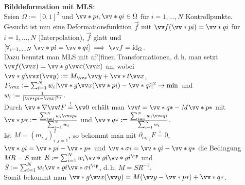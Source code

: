\linie

\textbf{Bilddeformation mit MLS}:\\
Seien $\Omega := [0, 1]^2$ und $\vecs{p}{i}, \vecs{q}{i} \in \Omega$
für $i = 1, \dotsc, N$ Kontrollpunkte.\\
Gesucht ist nun eine Deformationsfunktion $\vec{f}$ mit
$\vec{f}(\vecs{p}{i}) = \vecs{q}{i}$ für $i = 1, \dotsc, N$ (Interpolation),
$\vec{f}$ glatt und
$[\forall_{i=1,\dotsc,N}\; \vecs{p}{i} = \vecs{q}{i}] \implies \vec{f} = \id_\Omega$.\\
Dazu benutzt man MLS mit af"|finen Transformationen, d.\,h. man setzt
$\vec{f}(\vec{x}) = \vecs{g}{\vec{x}}(\vec{x})$ an,
wobei $\vecs{g}{\vec{x}}(\vec{y}) := M_{\vec{x}} \vec{y} + \vecs{t}{\vec{x}}$,
$F_{\vec{x}} := \sum_{i=1}^N w_i |\vecs{g}{\vec{x}}(\vecs{p}{i}) - \vecs{q}{i}|^2 \to \min$ und
$w_i := \frac{1}{|\vecs{p}{i} - \vec{x}|^{2\alpha}}$.\\
Durch $\vecs{\nabla}{\vec{t}} F \overset{!}{=} \vec{0}$
erhält man $\vec{t} = \vecs{q}{\ast} - M\vecs{p}{\ast}$ mit
$\vecs{p}{\ast} := \frac{\sum_{i=1}^N w_i\vecs{p}{i}}{\sum_{i=1}^N w_i}$ und
$\vecs{q}{\ast} := \frac{\sum_{i=1}^N w_i\vecs{q}{i}}{\sum_{i=1}^N w_i}$.\\
Ist $M = (m_{i,j})_{i,j=1}^2$, so bekommt man mit $\partial_{m_{i,j}} F \overset{!}{=} 0$,
$\vecs{\varrho}{i} = \vecs{p}{i} - \vecs{p}{\ast}$ und
$\vecs{\sigma}{i} = \vecs{q}{i} - \vecs{q}{\ast}$ die Bedingung
$MR = S$ mit
$R := \sum_{i=1}^N w_i \vecs{\varrho}{i} \vecs{\varrho}{i}^\tp$ und
$S := \sum_{i=1}^N w_i \vecs{\varrho}{i} \vecs{\sigma}{i}^\tp$,
d.\,h. $M = SR^{-1}$.\\
Somit bekommt man $\vecs{g}{\vec{x}}(\vec{y}) = M(\vec{y} - \vecs{p}{\ast}) + \vecs{q}{\ast}$.

\pagebreak
